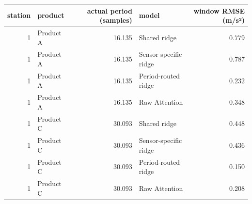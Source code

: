 \begin{tabular}{rlrlr}
\toprule
station & product & actual period (samples) & model & window RMSE (m/s²) \\
\midrule
1 & Product A & 16.135 & Shared ridge & 0.779 \\
1 & Product A & 16.135 & Sensor-specific ridge & 0.787 \\
1 & Product A & 16.135 & Period-routed ridge & 0.232 \\
1 & Product A & 16.135 & Raw Attention & 0.348 \\
1 & Product C & 30.093 & Shared ridge & 0.448 \\
1 & Product C & 30.093 & Sensor-specific ridge & 0.436 \\
1 & Product C & 30.093 & Period-routed ridge & 0.150 \\
1 & Product C & 30.093 & Raw Attention & 0.208 \\
\bottomrule
\end{tabular}
